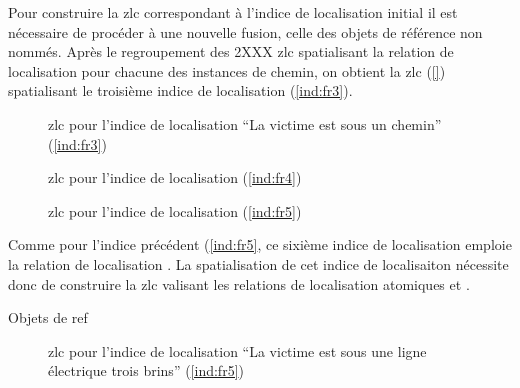 Pour construire la \ac{zlc} correspondant à l'indice de localisation
initial il est nécessaire de procéder à une nouvelle fusion, celle des
objets de référence non nommés.
%
Après le regroupement des 2XXX \ac{zlc} spatialisant la relation de
localisation  pour chacune des instances
de chemin, on obtient la \ac{zlc} (\autoref{}) spatialisant le
troisième indice de localisation (\ref{ind:fr3}).

\begin{figure}
  \centering
  
  \caption{\ac{zlc} pour l'indice de localisation \enquote{La victime
      est sous un chemin} (\ref{ind:fr3})}
\end{figure}



\begin{figure}
  \centering
  
  \caption{\ac{zlc} pour l'indice de localisation  (\ref{ind:fr4})}
\end{figure}


\begin{figure}
  \centering
  
  \caption{\ac{zlc} pour l'indice de localisation  (\ref{ind:fr5})}
\end{figure}




Comme pour l'indice précédent (\ref{ind:fr5}, ce sixième indice de
localisation emploie la relation de localisation
.
%
La spatialisation de cet indice de localisaiton nécessite donc de
construire la \ac{zlc} valisant les relations de localisation
atomiques  et .

Objets de ref

\begin{figure}
  \centering
  
  \caption{\ac{zlc} pour l'indice de localisation \enquote{La victime
      est sous une ligne électrique trois brins} (\ref{ind:fr5})}
\end{figure}


